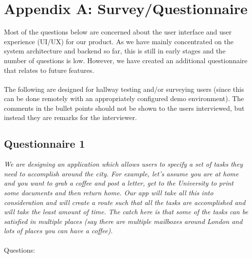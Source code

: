 \documentclass[a4paper, 10pt]{article}
\begin{document}
\section*{Appendix A: Survey/Questionnaire}
Most of the questions below are concerned about the user interface and user experience (UI/UX) for our product. As we have mainly concentrated on the system architecture and backend so far, this is still in early stages and the number of questions is low. However, we have created an additional questionnaire that relates to future features.\\\\
The following are designed for hallway testing and/or surveying users (since this can be done remotely with an appropriately configured demo environment). The comments in the bullet points should not be shown to the users interviewed, but instead they are remarks for the interviewer. \subsection*{Questionnaire 1}
\textit{We are designing an application which allows users to specify a set of tasks they need to accomplish around the city. For example, let's assume you are at home and you want to grab a coffee and post a letter, get to the University to print some documents and then return home. Our app will take all this into consideration and will create a route such that all the tasks are accomplished and will take the least amount of time. The catch here is that some of the tasks can be satisfied in multiple places (say there are multiple mailboxes around London and lots of places you can have a coffee).} \\\\
Questions:
\end{document}
